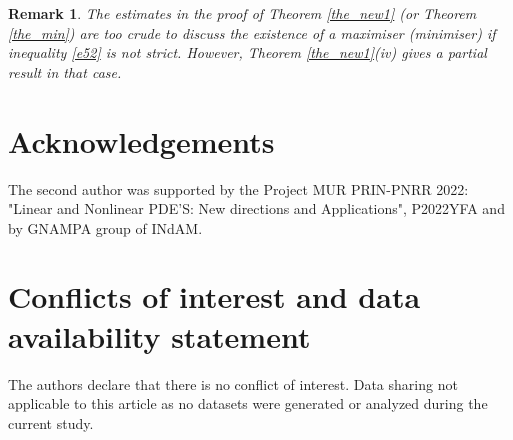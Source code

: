 \documentclass[a4paper,9pt]{article}
\newtheorem{remark} {Remark}
\begin{document}
\begin{remark}\label{rem4}
The estimates in the proof of Theorem \ref{the_new1} (or Theorem \ref{the_min}) are too crude to discuss the existence of a maximiser (minimiser) if inequality \eqref{e52} is not strict. However, Theorem \ref{the_new1}(iv) gives a partial result in that case.
\end{remark}

\section*{Acknowledgements}
The second author was supported by the Project MUR PRIN-PNRR 2022:  "Linear and Nonlinear PDE’S: New directions and Applications", P2022YFA and by
GNAMPA group of INdAM.


\section*{Conflicts of interest and data availability statement}
The authors declare that there is no conflict of interest. Data sharing not applicable to this article as no datasets were generated or analyzed during the current study.
\end{document}
